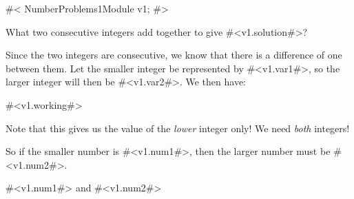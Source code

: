 

#<
NumberProblems1Module v1;
#>

What two consecutive integers add together to give #<v1.solution#>?

Since the two integers are consecutive, we know that there is a
difference of one between them.  Let the smaller integer be
represented by #<v1.var1#>, so the larger integer will then be
#<v1.var2#>.  We then have:

#<v1.working#>

Note that this gives us the value of the \emph{lower} integer only!
We need \emph{both} integers!

So if the smaller number is #<v1.num1#>, then the larger number must
be #<v1.num2#>.

#<v1.num1#> and #<v1.num2#>



